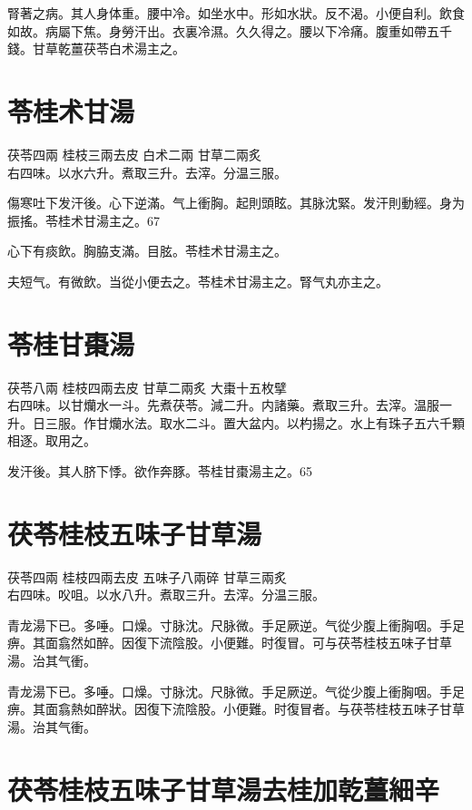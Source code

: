 腎著之病。其人身体重。腰中冷。如坐水中。形如水狀。反不渴。小便自利。飲食如故。病屬下焦。身勞汗出。衣裏冷濕。久久得之。腰以下冷痛。腹重如帶五千錢。甘{\khaaitp 草乾}薑{\khaaitp 茯}苓{\khaaitp 白}术湯主之。

\section{苓桂术甘湯}

茯苓{\scriptsize 四兩} 桂枝{\scriptsize 三兩去皮} 白术{\scriptsize 二兩} 甘草{\scriptsize 二兩炙}\\
右四味。以水六升。煮取三升。去滓。分温三服。

傷寒吐下发汗後。心下逆滿。气上衝胸。起則頭眩。其脉沈緊。发汗則動經。身为振搖。苓桂术甘湯主之。67

心下有痰飲。胸脇支滿。目胘。苓桂术甘湯主之。

夫短气。有微飲。当從小便去之。苓桂术甘湯主之。腎气丸亦主之。

\section{苓桂甘棗湯}

茯苓{\scriptsize 八兩} 桂枝{\scriptsize 四兩去皮} 甘草{\scriptsize 二兩炙} 大棗{\scriptsize 十五枚擘}\\
右四味。以甘爤水一斗。先煮茯苓。減二升。内諸藥。煮取三升。去滓。温服一升。日三服。作甘爤水法。取水二斗。置大盆内。以杓揚之。水上有珠子五六千顆相逐。取用之。

发汗後。其人脐下悸。欲作奔豚。苓桂甘棗湯主之。65

\section{茯苓桂枝五味子甘草湯}

茯苓{\scriptsize 四兩} 桂枝{\scriptsize 四兩去皮} 五味子{\scriptsize 八兩碎} 甘草{\scriptsize 三兩炙}\\
右四味。㕮咀。以水八升。煮取三升。去滓。分温三服。

青龙湯下已。多唾。口燥。寸脉沈。尺脉微。手足厥逆。气從少腹上衝胸咽。手足痹。其面翕然如醉。因復下流陰股。小便難。时復冒。可与茯苓桂枝五味子甘草湯。治其气衝。{\wuben}

青龙湯下已。多唾。口燥。寸脉沈。尺脉微。手足厥逆。气從少腹上衝胸咽。手足痹。其面翕熱如醉狀。因復下流陰股。小便難。时復冒者。与茯苓桂枝五味子甘草湯。治其气衝。{\dengben}

\section{茯苓桂枝五味子甘草湯去桂加乾薑細辛}

